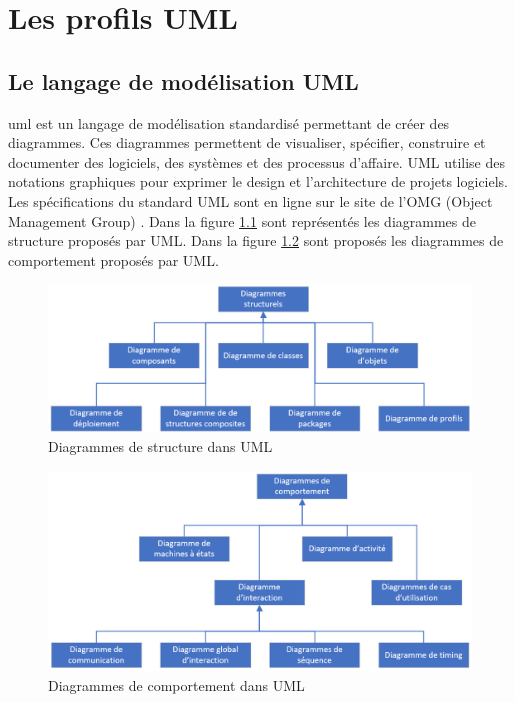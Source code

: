 \chapter{Les profils UML}
\label{profils-UML.sect}
\section{Le langage de modélisation UML}
\gls{uml} est un langage de modélisation standardisé permettant de créer des diagrammes.
Ces diagrammes permettent de visualiser, spécifier, construire et documenter des logiciels, des systèmes et des processus d'affaire.
UML utilise des notations graphiques pour exprimer le design et l'architecture de projets logiciels.
Les spécifications du standard UML sont en ligne sur le site de l'OMG (Object Management Group)  \cite{OMG_UML}.
Dans la figure \ref{fig.uml_struc} sont représentés les diagrammes de structure proposés par UML.
Dans la figure \ref{fig.uml_comp} sont proposés les diagrammes de comportement proposés par UML.

\begin{figure}[H]
    \centering
    \includegraphics[width=12cm]{10_img/chap4/structure.PNG}
    \caption{Diagrammes de structure dans UML \cite{OMG_UML}}
    \label{fig.uml_struc}
\end{figure}

\begin{figure}[H]
    \centering
    \includegraphics[width=12cm]{10_img/chap4/comportement.PNG}
    \caption{Diagrammes de comportement dans UML \cite{OMG_UML}}
    \label{fig.uml_comp}
\end{figure}


